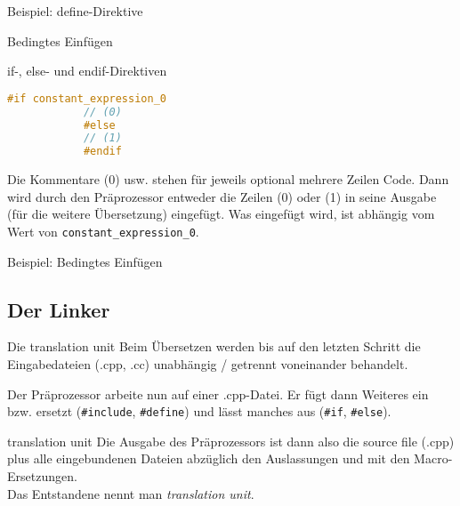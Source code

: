 \begin{frame}{Beispiel: define-Direktive}
	\footnotesize
	
\end{frame}

\begin{frame}[fragile]{Bedingtes Einfügen}
	\begin{block}{if-, else- und endif-Direktiven}
		\begin{lstlisting}[language=C++]
			#if constant_expression_0
			// (0)
			#else
			// (1)
			#endif
		\end{lstlisting}
		Die Kommentare (0) usw. stehen für jeweils optional mehrere Zeilen Code.
		Dann wird durch den Präprozessor entweder die Zeilen (0) oder (1) in seine Ausgabe (für die weitere Übersetzung) eingefügt. Was eingefügt wird, ist abhängig vom Wert von \verb|constant_expression_0|.
	\end{block}
\end{frame}

\begin{frame}[t]{Beispiel: Bedingtes Einfügen}
	\footnotesize
	\vspace{-0.5em}
	\alt<2>
	{%
		
	}{%
		
	}
\end{frame}




\subsection{Der Linker}

\begin{frame}[fragile]{Die translation unit}
	Beim Übersetzen werden bis auf den letzten Schritt die Eingabedateien (.cpp, .cc) unabhängig / getrennt voneinander behandelt.
	
	Der Präprozessor arbeite nun auf einer .cpp-Datei. Er fügt dann Weiteres ein bzw. ersetzt (\verb|#include|, \verb|#define|) und lässt manches aus (\verb|#if|, \verb|#else|).
	
	\vspace{1em}
	
	\begin{block}{translation unit}
		Die Ausgabe des Präprozessors ist dann also die source file (.cpp) plus alle eingebundenen Dateien abzüglich den Auslassungen und mit den Macro-Ersetzungen.\\
		Das Entstandene nennt man \emph{translation unit}.
	\end{block}
\end{frame}

